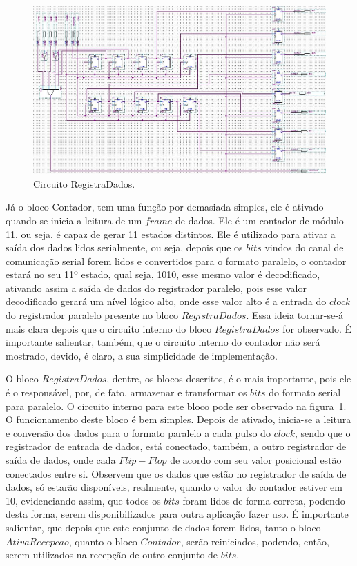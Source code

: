 \documentclass[12pt]{article}
\begin{document}
\begin{figure}[h]
\centering
\includegraphics[width=1\textwidth]{img/registradorsp.jpg}
\caption{Circuito RegistraDados.}
\label{fig:regd}
\end{figure}


Já o bloco Contador, tem uma função por demasiada simples, ele é ativado quando se inicia a leitura de um $frame$ de dados. Ele é um contador de módulo 11, ou seja, é capaz de gerar 11 estados distintos. Ele é utilizado para ativar a saída dos dados lidos serialmente, ou seja, depois que os $bits$ vindos do canal de comunicação serial forem lidos e convertidos para o formato paralelo, o contador estará no seu 11º estado, qual seja, 1010, esse mesmo valor é decodificado, ativando assim a saída de dados do registrador paralelo, pois esse valor decodificado gerará um nível lógico alto, onde esse valor alto é a entrada do $clock$ do registrador paralelo presente no bloco $RegistraDados$. Essa ideia tornar-se-á mais clara depois que o circuito interno do bloco $RegistraDados$ for observado. É importante salientar, também, que o circuito interno do contador não será mostrado, devido, é claro, a sua simplicidade de implementação.



O bloco $RegistraDados$, dentre, os blocos descritos, é o mais importante, pois ele é o responsável, por, de fato, armazenar e transformar os $bits$ do formato serial para paralelo. O circuito interno para este bloco pode ser observado na figura~\ref{fig:regd}.  O funcionamento deste bloco é bem simples. Depois de ativado, inicia-se a leitura e conversão dos dados para o formato paralelo a cada pulso do $clock$, sendo que o registrador de entrada de dados, está conectado, também, a outro registrador de saída de dados, onde cada $Flip-Flop$ de acordo com seu valor posicional estão conectados entre si. Observem que os dados que estão no registrador de saída de dados, só estarão disponíveis, realmente, quando o valor do contador estiver em 10, evidenciando assim, que todos os $bits$ foram lidos de forma correta, podendo desta forma, serem disponibilizados para outra aplicação fazer uso.  É importante salientar, que depois que este conjunto de dados forem lidos, tanto o bloco $AtivaRecepcao$, quanto o bloco $Contador$, serão reiniciados, podendo, então, serem utilizados na recepção de outro conjunto de $bits$.
\end{document}
